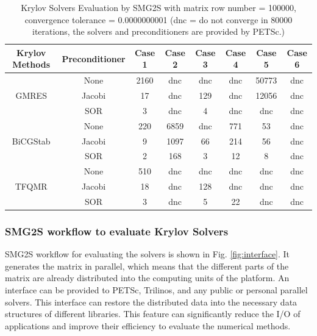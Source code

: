 \begin{table}[h]
	\caption{Krylov Solvers Evaluation by SMG2S with matrix row number = \num[round-precision=2,round-mode=figures]{100000}, convergence tolerance = \num[round-precision=2,round-mode=figures]{0.0000000001} (dnc = do not converge in  \num[round-precision=2,round-mode=figures]{80000} iterations, the solvers and preconditioners are provided by PETSc.)}
	\label{krylov}
	\centering
	\footnotesize
	\renewcommand{\arraystretch}{1.5}
	\begin{tabular}{cccccccc}
		\hline
		\textbf{Krylov Methods} & \textbf{Preconditioner} & \textbf{Case 1} & \textbf{Case 2} 
		& \textbf{Case 3} & \textbf{Case 4} & \textbf{Case 5} & \textbf{Case 6} \\ 
		\hline
		\multirow{3}{*}{GMRES} & None & 2160 & dnc
		& dnc & dnc &50773 & dnc\\ 
		\cline{2-8}
		& Jacobi& 17 & dnc & 129 & dnc &12056 & dnc\\
		\cline{2-8}
		& SOR& 3 &dnc & 4 &dnc & dnc & dnc\\
		\hline
		\multirow{3}{*}{BiCGStab} & None & 220 & 6859
		& dnc&771 &53 &dnc\\ 
		\cline{2-8}
		& Jacobi& 9& 1097 & 66 &214 & 56 &dnc\\
		\cline{2-8}
		& SOR&2 &168 & 3 & 12 & 8& dnc\\
		\hline
		\multirow{3}{*}{TFQMR} & None & 510 & dnc
		& dnc &dnc &dnc& dnc\\ 
		\cline{2-8}
		& Jacobi& 18 & dnc & 128 & dnc & dnc& dnc\\
		\cline{2-8}
		& SOR& 3&dnc &  5&22 &dnc& dnc\\
		\hline
		
	\end{tabular}
\end{table}

\subsubsection{SMG2S workflow to evaluate Krylov Solvers}

SMG2S workflow for evaluating the solvers is shown in Fig. \ref{fig:interface}. It generates the matrix in parallel, which means that the different parts of the matrix are already distributed into the computing units of the platform. An interface can be provided to PETSc, Trilinos, and any public or personal parallel solvers. This interface can restore the distributed data into the necessary data structures of different libraries. This feature can significantly reduce the I/O of applications and improve their efficiency to evaluate the numerical methods.

